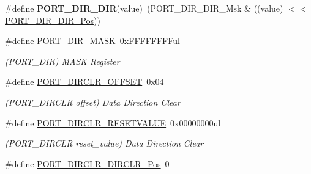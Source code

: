 \begin{DoxyCompactItemize}
\item 
\hypertarget{group___s_a_m_l21___p_o_r_t_ga87c01006429d0cd3c7d19b2ec7512231}{}\#define {\bfseries P\+O\+R\+T\+\_\+\+D\+I\+R\+\_\+\+D\+I\+R}(value)~(P\+O\+R\+T\+\_\+\+D\+I\+R\+\_\+\+D\+I\+R\+\_\+\+Msk \& ((value) $<$$<$ \hyperlink{group___s_a_m_l21___p_o_r_t_ga24c8369138b85d0fa6b7acdf9f8c8734}{P\+O\+R\+T\+\_\+\+D\+I\+R\+\_\+\+D\+I\+R\+\_\+\+Pos}))\label{group___s_a_m_l21___p_o_r_t_ga87c01006429d0cd3c7d19b2ec7512231}

\item 
\hypertarget{group___s_a_m_l21___p_o_r_t_ga1ac033c587515efaff3b5002747b1295}{}\#define \hyperlink{group___s_a_m_l21___p_o_r_t_ga1ac033c587515efaff3b5002747b1295}{P\+O\+R\+T\+\_\+\+D\+I\+R\+\_\+\+M\+A\+S\+K}~0x\+F\+F\+F\+F\+F\+F\+F\+Ful\label{group___s_a_m_l21___p_o_r_t_ga1ac033c587515efaff3b5002747b1295}

\begin{DoxyCompactList}\small\item\em (P\+O\+R\+T\+\_\+\+D\+I\+R) M\+A\+S\+K Register \end{DoxyCompactList}\item 
\hypertarget{group___s_a_m_l21___p_o_r_t_ga6617757b2b2a4873ca225341c0350b6b}{}\#define \hyperlink{group___s_a_m_l21___p_o_r_t_ga6617757b2b2a4873ca225341c0350b6b}{P\+O\+R\+T\+\_\+\+D\+I\+R\+C\+L\+R\+\_\+\+O\+F\+F\+S\+E\+T}~0x04\label{group___s_a_m_l21___p_o_r_t_ga6617757b2b2a4873ca225341c0350b6b}

\begin{DoxyCompactList}\small\item\em (P\+O\+R\+T\+\_\+\+D\+I\+R\+C\+L\+R offset) Data Direction Clear \end{DoxyCompactList}\item 
\hypertarget{group___s_a_m_l21___p_o_r_t_gae97e35763f237bbf69af7623183891a1}{}\#define \hyperlink{group___s_a_m_l21___p_o_r_t_gae97e35763f237bbf69af7623183891a1}{P\+O\+R\+T\+\_\+\+D\+I\+R\+C\+L\+R\+\_\+\+R\+E\+S\+E\+T\+V\+A\+L\+U\+E}~0x00000000ul\label{group___s_a_m_l21___p_o_r_t_gae97e35763f237bbf69af7623183891a1}

\begin{DoxyCompactList}\small\item\em (P\+O\+R\+T\+\_\+\+D\+I\+R\+C\+L\+R reset\+\_\+value) Data Direction Clear \end{DoxyCompactList}\item 
\hypertarget{group___s_a_m_l21___p_o_r_t_gaab58ac44a417949e78c7e743c2b6cb8e}{}\#define \hyperlink{group___s_a_m_l21___p_o_r_t_gaab58ac44a417949e78c7e743c2b6cb8e}{P\+O\+R\+T\+\_\+\+D\+I\+R\+C\+L\+R\+\_\+\+D\+I\+R\+C\+L\+R\+\_\+\+Pos}~0\label{group___s_a_m_l21___p_o_r_t_gaab58ac44a417949e78c7e743c2b6cb8e}


\end{DoxyCompactItemize}
